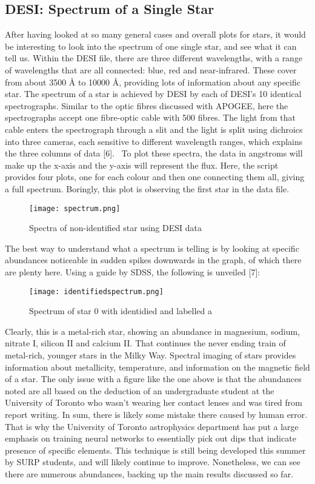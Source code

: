 \documentclass{article}
\begin{document}
\subsection*{DESI: Spectrum of a Single Star}
\indent After having looked at so many general cases and overall plots for stars, it would be interesting to look into the spectrum of one single star, and see what it can tell us. Within the DESI file, there are three different wavelengths, with a range of wavelengths that are all connected: blue, red and near-infrared. These cover from about 3500 Å to 10000 Å, providing lots of information about any specific star. The spectrum of a star is achieved by DESI by each of DESI’s 10 identical spectrographs. Similar to the optic fibres discussed with APOGEE, here the spectrographs accept one fibre-optic cable with 500 fibres. The light from that cable enters the spectrograph through a slit and the light is split using dichroics into three cameras, each sensitive to different wavelength ranges, which explains the three columns of data [6].  To plot these spectra, the data in angstroms will make up the x-axis and the y-axis will represent the flux. Here, the script provides four plots, one for each colour and then one connecting them all, giving a full spectrum. Boringly, this plot is observing the first star in the data file.\\
\begin{figure}[H]
    \centering
    \texttt{[image: spectrum.png]}
    \caption{Spectra of non-identified star using DESI data}
    \label{fig:5}
\end{figure}
\indent The best way to understand what a spectrum is telling is by looking at specific abundances noticeable in sudden spikes downwards in the graph, of which there are plenty here. Using a guide by SDSS, the following is unveiled [7]:
\begin{figure}[H]
    \centering
    \texttt{[image: identifiedspectrum.png]}
    \caption{Spectrum of star 0 with identidied and labelled a}
    \label{fig:enter-label}
\end{figure}
\indent Clearly, this is a metal-rich star, showing an abundance in magnesium, sodium, nitrate I, silicon II and calcium II. That continues the never ending train of metal-rich, younger stars in the Milky Way. Spectral imaging of stars provides information about metallicity, temperature, and information on the magnetic field of a star. The only issue with a figure like the one above is that the abundances noted are all based on the deduction of an undergraduate student at the University of Toronto who wasn’t wearing her contact lenses and was tired from report writing. In sum, there is likely some mistake there caused by human error. That is why the University of Toronto astrophysics department has put a large emphasis on training neural networks to essentially pick out dips that indicate presence of specific elements. This technique is still being developed this summer by SURP students, and will likely continue to improve. Nonetheless, we can see there are numerous abundances, backing up the main results discussed so far.\\
\end{document}
